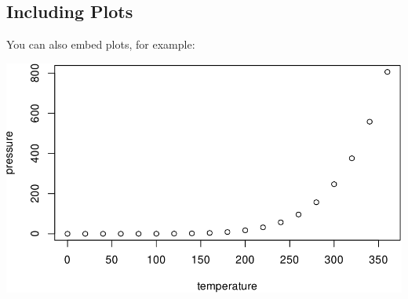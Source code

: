 \documentclass[
  11pt,
]{article}
\begin{document}
\kant[24]

\hypertarget{including-plots}{%
\subsection{Including Plots}\label{including-plots}}

You can also embed plots, for example:

\includegraphics{paper_files/figure-latex/pressure-1.pdf}

\kant[25]

\renewcommand\refname{References}
  


\end{document}
